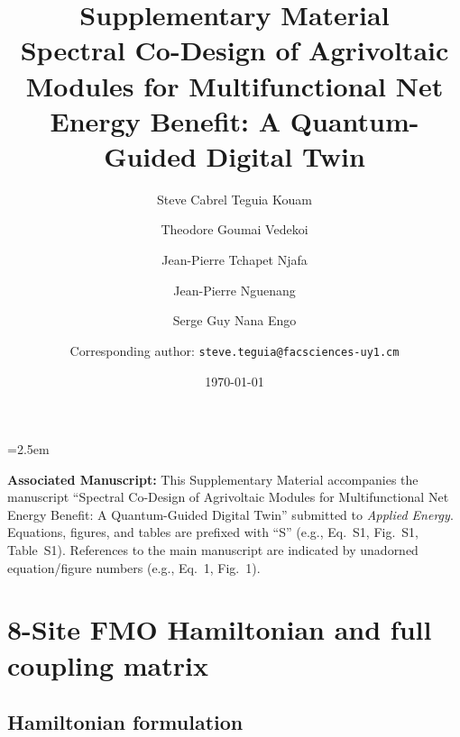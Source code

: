 \documentclass[11pt,a4paper]{article}
\begin{document}
\emergencystretch=2.5em

\title{\textbf{Supplementary Material}\\[0.5em]
\large Spectral Co-Design of Agrivoltaic Modules for Multifunctional Net Energy Benefit: A Quantum-Guided Digital Twin}

\author{Steve Cabrel Teguia Kouam}
\author{Theodore Goumai Vedekoi}
\author{Jean-Pierre Tchapet Njafa}
\author{Jean-Pierre Nguenang}
\author{Serge Guy Nana Engo}
\author{Corresponding author: \texttt{steve.teguia@facsciences-uy1.cm}}

\date{\today}

\maketitle

\noindent\textbf{Associated Manuscript:}
This Supplementary Material accompanies the manuscript ``Spectral Co-Design of Agrivoltaic Modules for Multifunctional Net Energy Benefit: A Quantum-Guided Digital Twin'' submitted to \textit{Applied Energy}. Equations, figures, and tables are prefixed with ``S'' (e.g., Eq.~S1, Fig.~S1, Table~S1). References to the main manuscript are indicated by unadorned equation/figure numbers (e.g., Eq.~1, Fig.~1).

\vspace{1em}

\tableofcontents

\newpage


\section{8-Site FMO Hamiltonian and full coupling matrix}
\label{SI-sec:hamiltonian}

\subsection{Hamiltonian formulation}
\end{document}
